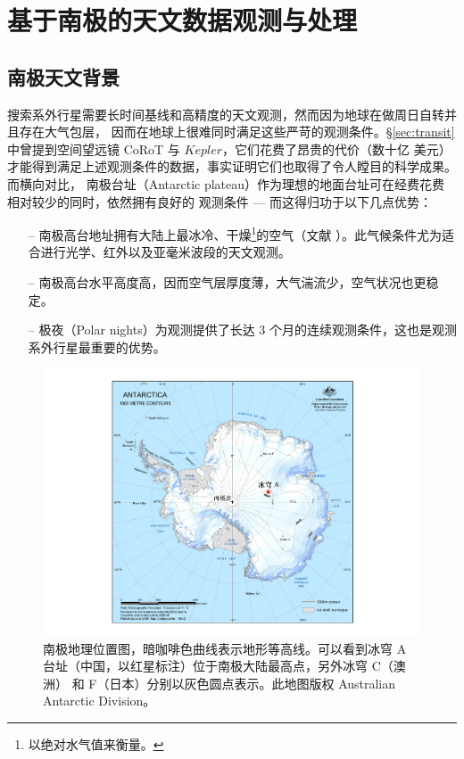 \chapter{基于南极的天文数据观测与处理} \label{chapter:obs_red}

\section{南极天文背景} \label{sec:antarticabg}

搜索系外行星需要长时间基线和高精度的天文观测，然而因为地球在做周日自转并且存在大气包层，
因而在地球上很难同时满足这些严苛的观测条件。\S \ref{sec:transit} 中曾提到空间望远镜 CoRoT
\cite{Bargeetal2008CoRoT} 与 $Kepler$\cite{Boruckietal2010}，它们花费了昂贵的代价（数十亿
美元）才能得到满足上述观测条件的数据，事实证明它们也取得了令人瞠目的科学成果。而横向对比，
南极台址（Antarctic plateau）作为理想的地面台址可在经费花费相对较少的同时，依然拥有良好的
观测条件 --- 而这得归功于以下几点优势：

\begin{itemize} %
\item[--] 南极高台地址拥有大陆上最冰冷、干燥\footnote{以绝对水气值来衡量。}的空气（文献 ）。此气候条件尤为适合进行光学、红外以及亚毫米波段的天文观测\cite{Lawrence2004}。
\item[--] 南极高台水平高度高，因而空气层厚度薄，大气湍流少，空气状况也更稳定\cite{Bonner2010}。
\item[--] 极夜（Polar nights）为观测提供了长达 3 个月的连续观测条件，这也是观测系外行星最重要的优势\cite{Rauer2008}。
\end{itemize}

\begin{figure}[t]
\centering
\includegraphics[width=1.0\textwidth]{figures/chapter2/f1_DomeA.pdf}
\caption{南极地理位置图，暗咖啡色曲线表示地形等高线。可以看到冰穹 A 台址（中国，以红星标注）位于南极大陆最高点，另外冰穹 C（澳洲） 和 F（日本）分别以灰色圆点表示。此地图版权 Australian Antarctic Division。}
\label{fig:domeasite}
\end{figure}

